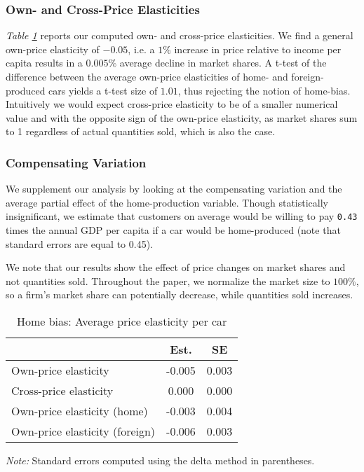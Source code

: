 \documentclass[11pt]{article}
\begin{document}
\subsubsection{Own- and Cross-Price Elasticities}
\textit{Table \ref{tab:elasticity_home_bias}} reports our computed own- and cross-price elasticities. We find a general own-price elasticity of $-0.05$, i.e. a $1\%$ increase in price relative to income per capita results in a $0.005\%$ average decline in market shares. A t-test of the difference between the average own-price elasticities of home- and foreign-produced cars yields a t-test size of $1.01$, thus rejecting the notion of home-bias. Intuitively we would expect cross-price elasticity to be of a smaller numerical value and with the opposite sign of the own-price elasticity, as market shares sum to 1 regardless of actual quantities sold, which is also the case. 

\subsubsection{Compensating Variation}
We supplement our analysis by looking at the compensating variation and the average partial effect of the home-production variable. Though statistically insignificant, we estimate that customers on average would be willing to pay \texttt{0.43} times the annual GDP per capita if a car would be home-produced (note that standard errors are equal to 0.45).

We note that our results show the effect of price changes on market shares and not quantities sold. Throughout the paper, we normalize the market size to $100\%$, so a firm's market share can potentially decrease, while quantities sold increases. 

\begin{table}[H]
    \centering
    \caption{Home bias: Average price elasticity per car}
    \label{tab:elasticity_home_bias}
    \begin{threeparttable}
    \begin{tabular}{lcc}
    \toprule
    {} &   Est. &     SE \\
    \midrule
    Own-price elasticity           & -0.005 &  0.003 \\
    Cross-price elasticity         &  0.000 &  0.000 \\
    Own-price elasticity (home)    & -0.003 &  0.004 \\
    Own-price elasticity (foreign) & -0.006 &  0.003 \\
    \bottomrule
    \end{tabular}
                \begin{tablenotes}
                \footnotesize \textit{Note:} Standard errors computed using the delta method in parentheses.
                \end{tablenotes}
    \end{threeparttable}
\end{table}
\end{document}
